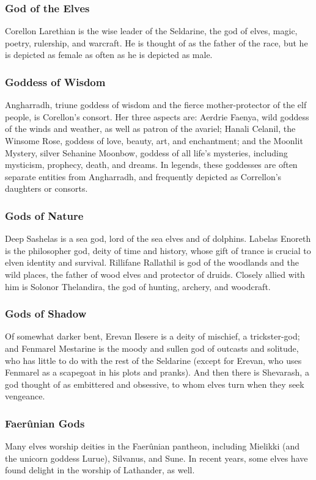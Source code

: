 \documentclass[10pt,a4paper,twoside,twocolumn,openany,bg=print,nodeprecatedcode]{dndbook}
\begin{document}
\subsubsection{God of the Elves}
Corellon Larethian is the wise leader of the Seldarine, the god of elves, magic, poetry, rulership, and warcraft. He is thought of as the father of the race, but he is depicted as female as often as he is depicted as male.
\subsubsection{Goddess of Wisdom}
Angharradh, triune goddess of wisdom and the fierce mother-protector of the elf people, is Corellon's consort. Her three aspects are: Aerdrie Faenya, wild goddess of the winds and weather, as well as patron of the avariel; Hanali Celanil, the Winsome Rose, goddess of love, beauty, art, and enchantment; and the Moonlit Mystery, silver Sehanine Moonbow, goddess of all life's mysteries, including mysticism, prophecy, death, and dreams. In legends, these goddesses are often separate entities from Angharradh, and frequently depicted as Correllon's daughters or consorts.
\subsubsection{Gods of Nature}
Deep Sashelas is a sea god, lord of the sea elves and of dolphins. Labelas Enoreth is the philosopher god, deity of time and history, whose gift of trance is crucial to elven identity and survival. Rillifane Rallathil is god of the woodlands and the wild places, the father of wood elves and protector of druids. Closely allied with him is Solonor Thelandira, the god of hunting, archery, and woodcraft.
\subsubsection{Gods of Shadow}
Of somewhat darker bent, Erevan Ilesere is a deity of mischief, a trickster-god; and Fenmarel Mestarine is the moody and sullen god of outcasts and solitude, who has little to do with the rest of the Seldarine (except for Erevan, who uses Fenmarel as a scapegoat in his plots and pranks). And then there is Shevarash, a god thought of as embittered and obsessive, to whom elves turn when they seek vengeance.
\subsubsection{Faerûnian Gods}
Many elves worship deities in the Faerûnian pantheon, including Mielikki (and the unicorn goddess Lurue), Silvanus, and Sune. In recent years, some elves have found delight in the worship of Lathander, as well.
\end{document}
